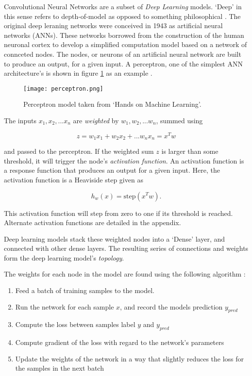 		Convolutional Neural Networks are a subset of \textit{Deep Learning} models. `Deep' in this sense refers to depth-of-model as opposed to something philosophical \cite{Chollet}. The original deep leraning networks were conceived in 1943 \cite{ANN} as artificial neural networks (ANNs). These networks borrowed from the construction of the human neuronal cortex to develop a simplified computation model based on a network of connceted nodes. The nodes, or neurons of an artificial neural network are built to produce an output, for a given input. A perceptron, one of the simplest ANN architecture's is shown in figure \ref{fig:percept} as an example \cite{Aurelien}.

		\begin{figure}[htbp]
		  \centering
		   \texttt{[image: perceptron.png]}
		  \caption[Perceptron node]{Perceptron model taken from `Hands on Machine Learning'\cite{Aurelien}.}
		  \label{fig:percept}
		\end{figure}

		The inputs $x_1, x_2, ... x_n$ are \textit{weighted} by $w_1, w_2, ...w_n$, summed using

		\begin{equation}
			z = w_1 x_1 + w_2 x_2 + ... w_n x_n = x^T w
		\end{equation}

		and passed to the perceptron. If the weighted sum $z$ is larger than some threshold, it will trigger the node's \textit{activation function}. An activation function is a response function that produces an output for a given input. Here, the activation function is a Heaviside step given as

		\begin{equation}\label{eq:heavy}
			h_w(x) = \textrm{step}(x^Tw).
		\end{equation}

		This activation function will step from zero to one if its threshold is reached. Alternate activation functions are detailed in the appendix.

	 	Deep learning models stack these weighted nodes into a `Dense' layer, and connected with other dense layers. The resulting series of connections and weights form the deep learning model's \textit{topology}.

		The weights for each node in the model are found using the following algorithm \cite{Chollet}:

		\begin{enumerate}
			\item Feed a batch of training samples to the model.
			\item Run the network for each sample $x$, and record the models prediction $y_{pred}$
			\item Compute the loss between samples label $y$ and $y_{pred}$
			\item Compute gradient of the loss with regard to the network's parameters
			\item Update the weights of the network in a way that slightly reduces the loss for the samples in the next batch
		\end{enumerate}

